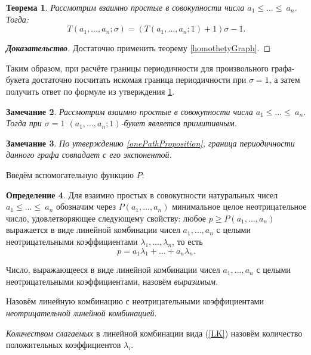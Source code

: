 \documentclass[12pt]{article}
\newtheorem{theorem}{Теорема}[section]
\newtheorem{remark}[theorem]{Замечание}
\theoremstyle{definition}
\newtheorem{definition}[theorem]{Определение}
\begin{document}
\begin{theorem}
\label{everyKFormula}
Рассмотрим взаимно простые в совокупности числа $a_1 \le \dots \le ~a_n$. Тогда:
\begin{equation*}
T(a_1, \dots, a_n; \sigma) = (T(a_1, \dots, a_n; 1) + 1)\sigma - 1.
\end{equation*}
\end{theorem}
\begin{proof}[\textbf{Доказательство}] 
Достаточно применить теорему \ref{homothetyGraph}.
\end{proof}

Таким образом, при расчёте границы периодичности для произвольного графа-букета достаточно посчитать искомая граница периодичности при $\sigma = 1$, а затем получить ответ по формуле из утверждения \ref{everyKFormula}. 

\begin{remark}
Рассмотрим взаимно простые в совокупности числа $a_1 \le \dots \le ~a_n$. Тогда при $\sigma = 1$ $(a_1, \dots, a_n; 1)$-букет является примитивным.
\end{remark}

\begin{remark}
\label{rmrk:expAndT}
По утверждению \ref{onePathProposition}, граница периодичности данного графа совпадает с его экспонентой.
\end{remark}

Введём вспомогательную функцию $P$:

\begin{definition}
Для взаимно простых в совокупности натуральных чисел $a_1 \le \dots \le~a_n$ обозначим через $P(a_1, \dots, a_n)$ минимальное целое неотрицательное число, удовлетворяющее следующему свойству: любое $p \ge P(a_1, \dots, a_n)$ выражается в виде линейной комбинации чисел $a_1, \dots, a_n$ с целыми неотрицательными коэффициентами $\lambda_1, \dots, \lambda_n$, то есть
\begin{equation}
\label{LK}
p = a_1 \lambda_1 + \dots + a_n \lambda_n.
\end{equation}

Число, выражающееся в виде линейной комбинации чисел $a_1, \dots, a_n$ с целыми неотрицательными коэффициентами, назовём \textit{выразимым}.

Назовём линейную комбинацию с неотрицательными коэффициентами \textit{неотрицательной линейной комбинацией}.

\textit{Количеством слагаемых} в линейной комбинации вида (\ref{LK}) назовём количество положительных коэффициентов $\lambda_i$.
\end{definition}
\end{document}
